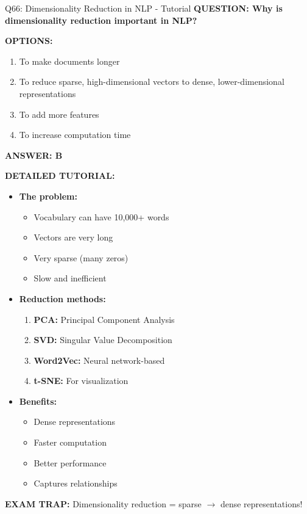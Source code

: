 \documentclass[8pt]{beamer}
\begin{document}
	\begin{frame}{Q66: Dimensionality Reduction in NLP - Tutorial}
		\fontsize{6.5}{7.5}\selectfont
		\textbf{QUESTION: Why is dimensionality reduction important in NLP?}
		
		\vspace{0.1cm}
		\textbf{OPTIONS:}
		\begin{enumerate}
			\item To make documents longer
			\item To reduce sparse, high-dimensional vectors to dense, lower-dimensional representations
			\item To add more features
			\item To increase computation time
		\end{enumerate}
		
		\vspace{0.1cm}
		\textcolor{myblue}{\textbf{ANSWER: B}}
		
		\vspace{0.1cm}
		\textbf{DETAILED TUTORIAL:}
		\begin{itemize}
			\item \textbf{The problem:}
			\begin{itemize}
				\item Vocabulary can have 10,000+ words
				\item Vectors are very long
				\item Very sparse (many zeros)
				\item Slow and inefficient
			\end{itemize}
			\item \textbf{Reduction methods:}
			\begin{enumerate}
				\item \textbf{PCA:} Principal Component Analysis
				\item \textbf{SVD:} Singular Value Decomposition
				\item \textbf{Word2Vec:} Neural network-based
				\item \textbf{t-SNE:} For visualization
			\end{enumerate}
			\item \textbf{Benefits:}
			\begin{itemize}
				\item Dense representations
				\item Faster computation
				\item Better performance
				\item Captures relationships
			\end{itemize}
		\end{itemize}
		
		\textcolor{myred}{\textbf{EXAM TRAP:}} Dimensionality reduction = \textcolor{myblue}{sparse $\to$ dense} representations!
	\end{frame}
	
\end{document}
